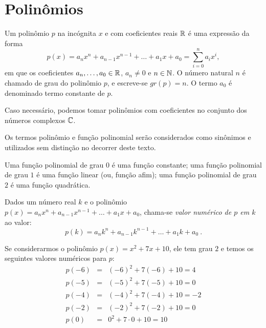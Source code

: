  \chapter{Polinômios}

\begin{obs}
  Um polinômio $p$ na incógnita $x$ e com coeficientes reais $\mathbb{R}$ é uma expressão da forma
\begin{equation*}
p(x)= a_nx^n + a_{n-1}x^{n-1}+ \ldots + a_1x+ a_0= \sum_{i=0}^{n} a_ix^i ,
\end{equation*}
  em que os coeficientes $a_n, \ldots, a_0 \in \mathbb{R}$, $a_n \neq 0$ e $n \in \mathbb{N}$. O número natural $n$ é chamado de grau do polinômio $p$, e escreve-se $gr(p)= n$. O termo $a_0$ é denominado termo constante de $p$.
\end{obs}

  Caso necessário, podemos tomar polinômios com coeficientes no conjunto dos números complexos $\mathbb{C}$.

 Os termos polinômio e função polinomial serão considerados como sinônimos e utilizados sem distinção no decorrer deste texto.

 Uma função polinomial de grau $0$ é uma função constante; uma função polinomial de grau $1$ é uma função linear (ou, função afim); uma função polinomial de grau $2$ é uma função quadrática.


 \begin{obs}
 Dados um número real $k$ e o polinômio $p(x)= a_nx^n + a_{n-1}x^{n-1}+ \ldots + a_1x+ a_0$, chama-se \emph{valor numérico de $p$ em $k$} ao valor:
\begin{equation*}
p(k)= a_nk^n + a_{n-1}k^{n-1}+ \ldots + a_1k+ a_0 \ .
\end{equation*}
 \end{obs}

\begin{exem}
Se considerarmos o polinômio $p(x)= x^2 + 7x+10$, ele tem grau $2$ e temos os seguintes valores numéricos para $p$:
\begin{eqnarray*}
p(-6)&=& (-6)^2 + 7(-6) +10= 4\\
p(-5)&=& (-5)^2 + 7(-5) +10= 0\\
p(-4)&=& (-4)^2 + 7(-4) +10= -2\\
p(-2)&=& (-2)^2 + 7(-2) +10= 0\\
p(0)&=& 0^2 + 7 \cdot 0 +10= 10\\
\end{eqnarray*}
\end{exem}

